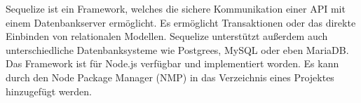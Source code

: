 
Sequelize ist ein Framework, welches die sichere Kommunikation einer API mit einem Datenbankserver ermöglicht. Es ermöglicht Transaktionen oder das direkte Einbinden von relationalen Modellen. Sequelize unterstützt außerdem auch unterschiedliche Datenbanksysteme wie Postgrees, MySQL oder eben MariaDB. Das Framework ist für Node.js verfügbar und implementiert worden. Es kann durch den Node Package Manager (NMP) in das Verzeichnis eines Projektes hinzugefügt werden. 